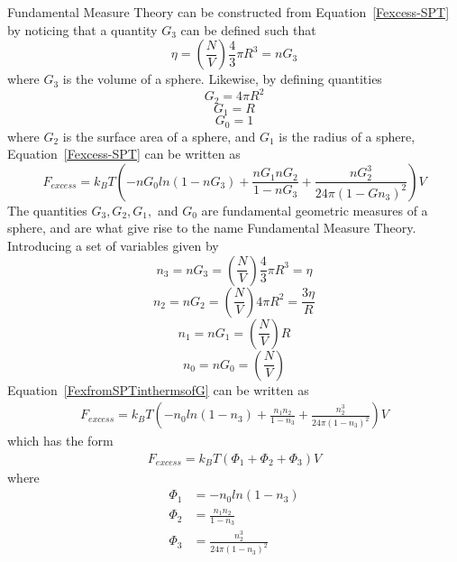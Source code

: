 \documentclass[double,12pt]{beavtex}
\begin{document}
Fundamental Measure Theory can be constructed from Equation~\ref{Fexcess-SPT}  
%
by noticing that a quantity $G_{3}$ can be defined such that
\begin{equation}{\eta =\left(\frac{N}{V}\right)\frac{4}{3}\pi{R^3}=nG_{3}}\end{equation}
where $G_{3}$ is the volume of a sphere. 
Likewise, by defining quantities
\begin{equation}{G_{2}=4\pi{R^2}}\end{equation}
\begin{equation}{G_{1}=R}\end{equation}
\begin{equation}{G_{0}=1}\end{equation}
where $G_{2}$ is the surface area of a sphere, and $G_{1}$ is the 
radius of a sphere, Equation~\ref{Fexcess-SPT} can be written as
\begin{equation}\label{FexfromSPTinthermsofG}{F_{excess}=k_{B}T\left(-nG_{0}ln(1-nG_{3})+\frac{nG_{1}nG_{2}}{1-nG_{3}}+\frac{nG_{2}^3}{24\pi(1-Gn_{3})^2}\right)V}\end{equation}
The quantities $G_{3}, G_{2}, G_{1},$ and $G_{0}$ are fundamental 
geometric measures of a sphere, and are what give rise to the name
Fundamental Measure Theory. Introducing a set of variables
given by
\begin{equation}\label{n3}{n_{3}=nG_{3}=\left(\frac{N}{V}\right)\frac{4}{3}\pi{R^3}=\eta}\end{equation}
\begin{equation}\label{n2}{n_{2}=nG_{2}=\left(\frac{N}{V}\right)4\pi{R^2}=\frac{3\eta}{R}}\end{equation}
\begin{equation}\label{n1}{n_{1}=nG_{1}=\left(\frac{N}{V}\right)R}\end{equation}
\begin{equation}\label{n0}{n_{0}=nG_{0}=\left(\frac{N}{V}\right)}\end{equation}
Equation~\ref{FexfromSPTinthermsofG} can be written as
\begin{align}\label{FexfromSPT}
    F_{excess}=k_{B}T\left(-n_{0}ln(1-n_{3})+\frac{n_{1}n_{2}}{1-n_{3}}+\frac{n_{2}^3}{24\pi(1-n_{3})^2}\right)V
\end{align}
which has the form 
\begin{align}
    F_{excess} = k_BT(\Phi_1+\Phi_2+\Phi_3)V
\end{align}
where 
\begin{align}
   \Phi_1 &= -n_{0}ln(1-n_{3}) \\
   \Phi_2 &= \frac{n_{1}n_{2}}{1-n_{3}} \\
   \Phi_3 &= \frac{n_{2}^3}{24\pi(1-n_{3})^2}   \label{oldPhi3equation}
\end{align}
\end{document}
